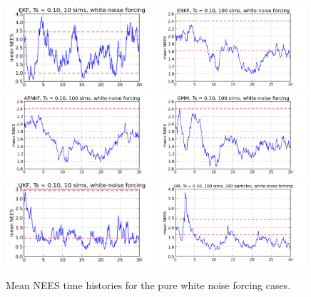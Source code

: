 \documentclass[]{article}
\begin{document}
\begin{figure}[p!]
\centering
\includegraphics[width=0.49\textwidth]{../../challenge_problem/trials/nees_ekf_sims_01_medium}
\includegraphics[width=0.49\textwidth]{../../challenge_problem/trials/nees_enkf_sims_01_medium}
\includegraphics[width=0.49\textwidth]{../../challenge_problem/trials/nees_aenkf_sims_01_medium}
\includegraphics[width=0.49\textwidth]{../../challenge_problem/trials/nees_gmm_sims_01_medium}
\includegraphics[width=0.49\textwidth]{../../challenge_problem/trials/nees_ukf_sims_01_medium}
\includegraphics[width=0.49\textwidth]{../../challenge_problem/trials/nees_sir_200_sims_01_medium}
\caption{Mean NEES time histories for the pure white noise forcing cases.}
\label{fig:nees_01_medium}
\end{figure}
\end{document}
